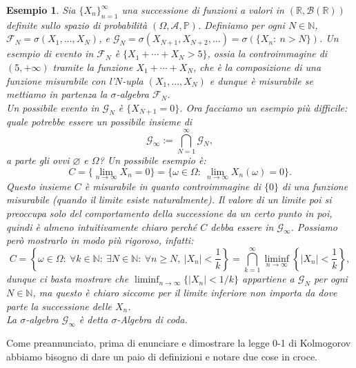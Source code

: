 \documentclass[11pt]{book}
\theoremstyle{Definizione}
\theoremstyle{TeoremaProposizioneLemmaCorollario}
\theoremstyle{OsservazioneNota}
\newtheorem{myes}{Esempio}[section]
\newcommand{\R}{\mathbb{R}}
\newcommand{\N}{\mathbb{N}}
\renewcommand{\P}{\mathbb{P}}
\begin{document}
\begin{myes}
Sia $\{X_n\}_{n = 1}^\infty$ una successione di funzioni a valori in $(\R,\mathcal{B}(\R))$ definite sullo spazio di probabilità $(\Omega,\mathcal{A},\P)$. Definiamo per ogni $N\in \N$, $\mathcal{F}_N = \sigma(X_1,\dots,X_N)$, e $\mathcal{G}_N = \sigma(X_{N+1},X_{N+2},\dots) = \sigma(\{X_n:\ n> N\})$. Un esempio di evento in $\mathcal{F}_N$ è $\{X_1+\cdots+X_N > 5\}$, ossia la controimmagine di $(5,+\infty)$ tramite la funzione $X_1+\cdots+X_N$, che è la composizione di una funzione misurabile con l'$N$-upla $(X_1,\dots,X_N)$ e dunque è misurabile se mettiamo in partenza la $\sigma$-algebra $\mathcal{F}_N$.\\
Un possibile evento in $\mathcal{G}_N$ è $\{X_{N+1} = 0\}$. Ora facciamo un esempio più difficile: quale potrebbe essere un possibile insieme di
$$
\mathcal{G}_\infty := \bigcap_{N = 1}^\infty \mathcal{G}_N,
$$
a parte gli ovvi $\varnothing$ e $\Omega$? Un possibile esempio è:
$$
C = \Big\{\lim_{n\to \infty} X_n = 0\Big\} = \Big\{\omega\in \Omega:\ \lim_{n\to \infty} X_n(\omega) = 0\Big\}.
$$
Questo insieme $C$ è misurabile in quanto controimmagine di $\{0\}$ di una funzione misurabile (quando il limite esiste naturalmente). Il valore di un limite poi si preoccupa solo del comportamento della successione da un certo punto in poi, quindi è almeno intuitivamente chiaro perché $C$ debba essere in $\mathcal{G}_\infty$. Possiamo però mostrarlo in modo più rigoroso, infatti:
$$
C = \left\{\omega\in \Omega:\ \forall k\in \N:\ \exists N\in \N:\ \forall n \geq N,\ |X_n|<\frac{1}{k}\right\} = \bigcap_{k = 1}^\infty \liminf_{n \to\infty} \left\{|X_n| < \frac{1}{k}\right\},
$$
dunque ci basta mostrare che $\liminf_{n\to\infty} \{|X_n| < 1/k\}$ appartiene a $\mathcal{G}_N$ per ogni $N\in \N$, ma questo è chiaro siccome per il limite inferiore non importa da dove parte la successione delle $X_n$.\\
La $\sigma$-algebra $\mathcal{G}_\infty$ è detta $\sigma$-Algebra di coda.
\end{myes}
Come preannunciato, prima di enunciare e dimostrare la legge 0-1 di Kolmogorov abbiamo bisogno di dare un paio di definizioni e notare due cose in croce.
\end{document}
